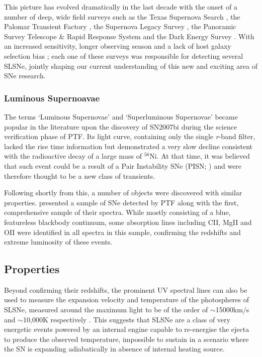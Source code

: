 This picture has evolved dramatically in the last decade with the onset of a number of deep, wide field surveys such as the Texas Supernova Search \citep[TSS;][]{Quimby2006}, the Palomar Transient Factory \citep[PTF;][]{Law2009, Rau2009}, the Supernova Legacy Survey \citep[SNLS;][]{Astier2005,Guy2010,Perrett2010}, the Panoramic Survey Telescope \& Rapid Response System \citep[Pan-STARRS;][]{Kaiser2010} and the Dark Energy Survey \citep[DES;][]{Flaugher2005}. With an increased sensitivity, longer observing season and a lack of host galaxy selection bias ; each one of these surveys was responsible for detecting several SLSNe, jointly shaping our current understanding of this new and exciting area of SNe research.

\subsubsection{Luminous Supernoavae}
The terms `Luminous Supernovae' and `Superluminous Supernovae' became popular in the literature upon the discovery of SN2007bi \citep{Gal-Yam2009} during the science verification phase of PTF. Its light curve, containing only the single \textit{r}-band filter, lacked the rise time information but demonstrated a very slow decline consistent with the radioactive decay of a large mass of $^{56}$Ni. At that time, it was believed that such event could be a result of a Pair Instability SNe (PISN; ) and were therefore thought to be a new class of transients.

Following shortly from this, a number of objects were discovered with similar properties. \citet{Quimby2011} presented a sample of SNe detected by PTF along with the first, comprehensive sample of their spectra. While mostly consisting of a blue, featureless blackbody continuum, some absorption lines including CII, MgII and OII \citep[see ][for more recent line identification]{Mazzali2015a} were identified in all spectra in this sample, confirming the redshifts and extreme luminosity of these events.

\subsection{Properties}
Beyond confirming their redshifts, the prominent UV spectral lines can also be used to measure the expansion velocity and temperature of the photospheres of SLSNe, measured around the maximum light to be of the order of $\sim$15000km/s and $\sim$10,000K respectively \citep{Inserra2013}. This suggests that SLSNe are a class of very energetic events powered by an internal engine capable to re-energise the ejecta to produce the observed temperature, impossible to sustain in a scenario where the SN is expanding adiabatically in absence of internal heating source.

